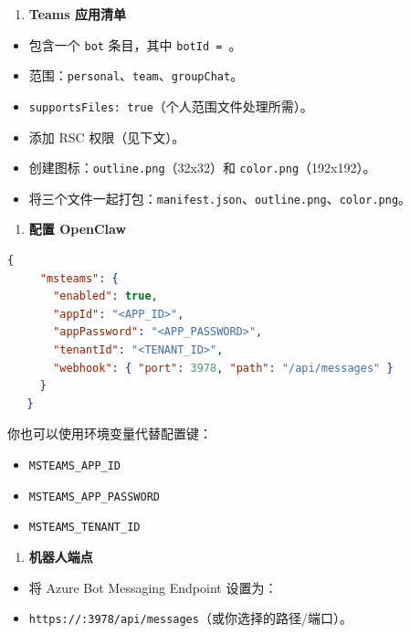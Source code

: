 \begin{enumerate}
  \item \textbf{Teams 应用清单}
\end{enumerate}

\begin{itemize}
  \item 包含一个 \texttt{bot} 条目，其中 \texttt{botId = }。
  \item 范围：\texttt{personal}、\texttt{team}、\texttt{groupChat}。
  \item \texttt{supportsFiles: true}（个人范围文件处理所需）。
  \item 添加 RSC 权限（见下文）。
  \item 创建图标：\texttt{outline.png}（32x32）和 \texttt{color.png}（192x192）。
  \item 将三个文件一起打包：\texttt{manifest.json}、\texttt{outline.png}、\texttt{color.png}。
\end{itemize}


\begin{enumerate}
  \item \textbf{配置 OpenClaw}
\end{enumerate}


\begin{lstlisting}[language=json]
   {
     "msteams": {
       "enabled": true,
       "appId": "<APP_ID>",
       "appPassword": "<APP_PASSWORD>",
       "tenantId": "<TENANT_ID>",
       "webhook": { "port": 3978, "path": "/api/messages" }
     }
   }
\end{lstlisting}


你也可以使用环境变量代替配置键：
\begin{itemize}
  \item \texttt{MSTEAMS\_APP\_ID}
  \item \texttt{MSTEAMS\_APP\_PASSWORD}
  \item \texttt{MSTEAMS\_TENANT\_ID}
\end{itemize}


\begin{enumerate}
  \item \textbf{机器人端点}
\end{enumerate}

\begin{itemize}
  \item 将 Azure Bot Messaging Endpoint 设置为：
  \item \texttt{https://:3978/api/messages}（或你选择的路径/端口）。
\end{itemize}


